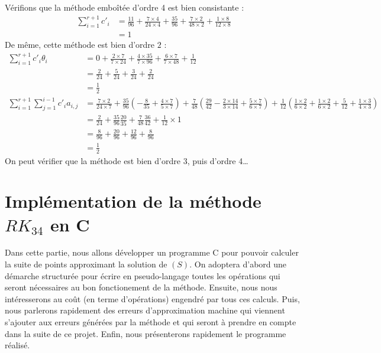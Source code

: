 \documentclass[a4paper, titlepage]{livret} %
\begin{document}
				Vérifions que la méthode emboîtée d'ordre 4 est bien consistante :
				\[\begin{aligned}
					\sum_{i = 1}^{r+1} c'_{i} & = \frac{11}{96} + \frac{7 \times 4}{24 \times 4} + \frac{35}{96} + \frac{7 \times 2}{48 \times 2} + \frac{1\times 8}{12 \times 8}\\
										   & = 1
				\end{aligned}\]
				De même, cette méthode est bien d'ordre $2$ :
				\[\begin{aligned}
					\sum \limits_{i = 1}^{r+1} c'_{i}\theta_{i} & = 0 + \frac{2 \times 7}{7 \times 24} + \frac{4 \times 35}{7 \times 96} + \frac{6 \times 7}{7 \times 48} + \frac{1}{12}\\
															 & = \frac{2}{24} + \frac{5}{24} + \frac{3}{24} + \frac{2}{24}\\
										   					 & = \frac{1}{2}\\
					\sum \limits_{i = 1}^{r+1}\sum \limits_{j = 1}^{i-1} c'_{i}a_{i,j} & = \frac{7 \times 2}{24 \times 7} + \frac{35}{96}(-\frac{8}{35} + \frac{4 \times 7}{5 \times 7}) + \frac{7}{48}(\frac{29}{42} - \frac{2 \times 14}{3 \times 14} + \frac{5 \times 7}{6 \times 7}) + \frac{1}{12}(\frac{1\times 2}{6 \times 2} + \frac{1\times 2}{6 \times 2} + \frac{5}{12} + \frac{1 \times 3}{4\times 3}) \\
					& = \frac{2}{24} + \frac{35}{96}\frac{20}{35} + \frac{7}{48}\frac{36}{42} + \frac{1}{12}\times1 \\
					& = \frac{8}{96} + \frac{20}{96} + \frac{12}{96} + \frac{8}{96} \\
					& = \frac{1}{2}
				\end{aligned}\]
				On peut vérifier que la méthode est bien d'ordre 3, puis d'ordre 4…



	\chapter{Implémentation de la méthode $RK_{34}$ en C}
		Dans cette partie, nous allons développer un programme C pour pouvoir calculer la suite de points approximant la solution de $(S)$.
		On adoptera d'abord une démarche structurée pour écrire en pseudo-langage toutes les opérations qui seront nécessaires au bon fonctionement de la méthode.
		Ensuite, nous nous intéresserons au coût (en terme d'opérations) engendré par tous ces calculs.
		Puis, nous parlerons rapidement des erreurs d'approximation machine qui viennent s'ajouter aux erreurs générées par la méthode et qui seront à prendre en compte dans la suite de ce projet.
		Enfin, nous présenterons rapidement le programme réalisé.
\end{document}
